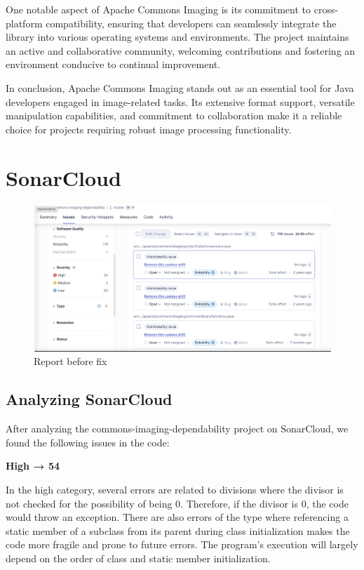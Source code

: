 \documentclass[sigconf]{acmart}
\begin{document}
One notable aspect of Apache Commons Imaging is its commitment to cross-platform compatibility, ensuring that developers can seamlessly integrate the library into various operating systems and environments. The project maintains an active and collaborative community, welcoming contributions and fostering an environment conducive to continual improvement.

In conclusion, Apache Commons Imaging stands out as an essential tool for Java developers engaged in image-related tasks. Its extensive format support, versatile manipulation capabilities, and commitment to collaboration make it a reliable choice for projects requiring robust image processing functionality.

\section{SonarCloud}

\begin{figure}[h!]
    \centering
    \includegraphics[width=1\linewidth]{reportSonarCloud.png}
    \caption{Report before fix}
    \label{fig:enter-label}
\end{figure}


\subsection{Analyzing SonarCloud}

After analyzing the commons-imaging-dependability project on SonarCloud, we found the following issues in the code:

\textbf{High → 54}

In the high category, several errors are related to divisions where the divisor is not checked for the possibility of being 0. Therefore, if the divisor is 0, the code would throw an exception. There are also errors of the type where referencing a static member of a subclass from its parent during class initialization makes the code more fragile and prone to future errors. The program's execution will largely depend on the order of class and static member initialization.
\end{document}
